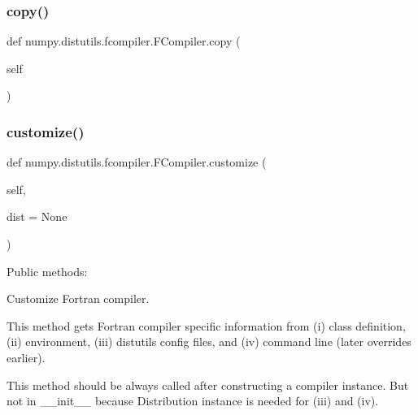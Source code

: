 \subsubsection{\texorpdfstring{copy()}{copy()}}
{\footnotesize\ttfamily def numpy.\+distutils.\+fcompiler.\+F\+Compiler.\+copy (\begin{DoxyParamCaption}\item[{}]{self }\end{DoxyParamCaption})}

\mbox{\label{classnumpy_1_1distutils_1_1fcompiler_1_1FCompiler_aabf6d4c61ae7d3ad085b92132999f6ce}} 
\subsubsection{\texorpdfstring{customize()}{customize()}}
{\footnotesize\ttfamily def numpy.\+distutils.\+fcompiler.\+F\+Compiler.\+customize (\begin{DoxyParamCaption}\item[{}]{self,  }\item[{}]{dist = {\ttfamily None} }\end{DoxyParamCaption})}



Public methods\+: 

\begin{DoxyVerb}Customize Fortran compiler.

This method gets Fortran compiler specific information from
(i) class definition, (ii) environment, (iii) distutils config
files, and (iv) command line (later overrides earlier).

This method should be always called after constructing a
compiler instance. But not in __init__ because Distribution
instance is needed for (iii) and (iv).
\end{DoxyVerb}
 \mbox{\label{classnumpy_1_1distutils_1_1fcompiler_1_1FCompiler_adb868ec551e9c065cc36bf3ea77d4bb5}} 
